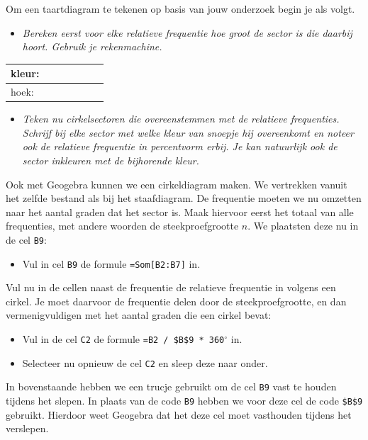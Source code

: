 \documentclass[11pt]{article}
\newcommand{\vraag}[2]{\begin{itemize}\item {\it #1} \vspace*{#2}\end{itemize}}
\newcommand{\degree}{\ensuremath{^\circ}}
\begin{document}
Om een taartdiagram te tekenen op basis van jouw onderzoek begin je als volgt.
\vraag{Bereken eerst voor elke relatieve frequentie hoe groot de sector is die daarbij hoort. Gebruik
je rekenmachine.}{0cm}

\begin{center}
  \begin{tabular}{|p{1.5cm}|p{1.5cm}|p{1.5cm}|p{1.5cm}|p{1.5cm}|p{1.5cm}|p{1.5cm}|}
    \hline
    kleur:\vspace{0.5cm}&&&&&&\\
    \hline
    hoek:\vspace{0.5cm}&&&&&&\\
    \hline
  \end{tabular}
\end{center}

\vraag{Teken nu cirkelsectoren die overeenstemmen met de relatieve frequenties. Schrijf bij elke
sector met welke kleur van snoepje hij overeenkomt en noteer ook de relatieve frequentie in
percentvorm erbij. Je kan natuurlijk ook de sector inkleuren met de bijhorende kleur.}{2cm}
\begin{center}
\end{center}

Ook met Geogebra kunnen we een cirkeldiagram maken. We vertrekken vanuit het zelfde bestand als bij
het staafdiagram. De frequentie moeten we nu omzetten naar het aantal graden dat het sector is. Maak
hiervoor eerst het totaal van alle frequenties, met andere woorden de steekproefgrootte $n$. We plaatsten deze nu in de cel \verb#B9#:
\begin{itemize}
  \item Vul in cel \verb#B9# de formule \verb$=Som[B2:B7]$ in.
\end{itemize}
Vul nu in de cellen naast de frequentie de relatieve frequentie in volgens een cirkel. Je moet daarvoor de frequentie delen door de steekproefgrootte, en dan vermenigvuldigen met het aantal graden die een cirkel bevat:
\begin{itemize}
  \item Vul in de cel \verb#C2# de formule \verb#=B2 / $B$9 * 360#$\degree$ in.
  \item Selecteer nu opnieuw de cel \verb#C2# en sleep deze naar onder.
\end{itemize}
In bovenstaande hebben we een trucje gebruikt om de cel \verb#B9# vast te houden tijdens het slepen. In plaats van de code \verb#B9# hebben we voor deze cel de code \verb#$B$9# gebruikt. Hierdoor weet Geogebra dat het deze cel moet vasthouden tijdens het verslepen.
\end{document}
